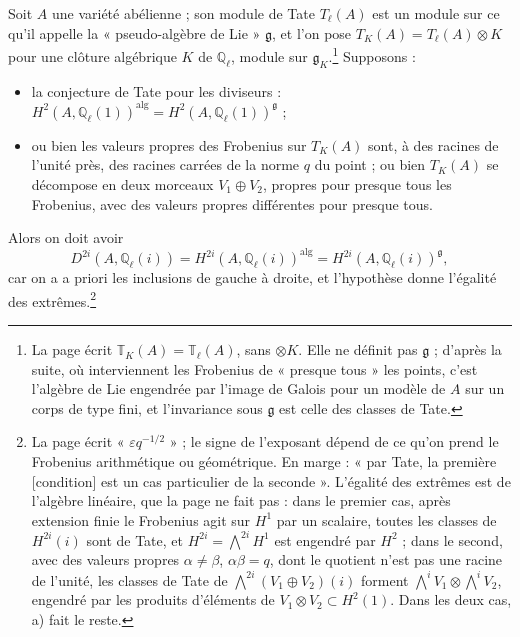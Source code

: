 \documentclass[11pt,a4paper]{article}
\begin{document}
Soit $A$ une variété abélienne ; son module de Tate $T_{\ell}(A)$ est un module
sur ce qu'il appelle la « pseudo-algèbre de Lie » $\mathfrak{g}$, et l'on pose
$T_{K}(A) = T_{\ell}(A) \otimes K$ pour une clôture algébrique $K$ de
$\mathbb{Q}_{\ell}$, module sur $\mathfrak{g}_{K}$.\footnote{La page écrit
$\mathbb{T}_{K}(A) = \mathbb{T}_{\ell}(A)$, sans $\otimes K$. Elle ne définit
pas $\mathfrak{g}$ ; d'après la suite, où interviennent les Frobenius de
« presque tous » les points, c'est l'algèbre de Lie engendrée par l'image de
Galois pour un modèle de $A$ sur un corps de type fini, et l'invariance sous
$\mathfrak{g}$ est celle des classes de Tate.} Supposons :
\begin{itemize}
  \item[a)] la conjecture de Tate pour les diviseurs : $H^{2}(A,
  \mathbb{Q}_{\ell}(1))^{\mathrm{alg}} = H^{2}(A,
  \mathbb{Q}_{\ell}(1))^{\mathfrak{g}}$ ;
  \item[b)] ou bien les valeurs propres des Frobenius sur $T_{K}(A)$ sont, à des
  racines de l'unité près, des racines carrées de la norme $q$ du point ; ou
  bien $T_{K}(A)$ se décompose en deux morceaux $V_{1} \oplus V_{2}$, propres
  pour presque tous les Frobenius, avec des valeurs propres différentes pour
  presque tous.
\end{itemize}
Alors on doit avoir
\[
D^{2i}(A, \mathbb{Q}_{\ell}(i)) = H^{2i}(A, \mathbb{Q}_{\ell}(i))^{\mathrm{alg}}
= H^{2i}(A, \mathbb{Q}_{\ell}(i))^{\mathfrak{g}} ,
\]
car on a a priori les inclusions de gauche à droite, et l'hypothèse donne
l'égalité des extrêmes.\footnote{La page écrit « $\varepsilon q^{-1/2}$ » ; le
signe de l'exposant dépend de ce qu'on prend le Frobenius arithmétique ou
géométrique. En marge : « par Tate, la première [condition] est un cas
particulier de la seconde ». L'égalité des extrêmes est de l'algèbre
linéaire, que la page ne fait pas : dans le premier cas, après extension finie
le Frobenius agit sur $H^{1}$ par un scalaire, toutes les classes de $H^{2i}(i)$
sont de Tate, et $H^{2i} = \bigwedge^{2i}H^{1}$ est engendré par $H^{2}$ ; dans
le second, avec des valeurs propres $\alpha \neq \beta$, $\alpha\beta = q$,
dont le quotient n'est pas une racine de l'unité, les classes de Tate de
$\bigwedge^{2i}(V_{1} \oplus V_{2})(i)$ forment $\bigwedge^{i}V_{1} \otimes
\bigwedge^{i}V_{2}$, engendré par les produits d'éléments de $V_{1} \otimes V_{2}
\subset H^{2}(1)$. Dans les deux cas, a) fait le reste.}
\end{document}
